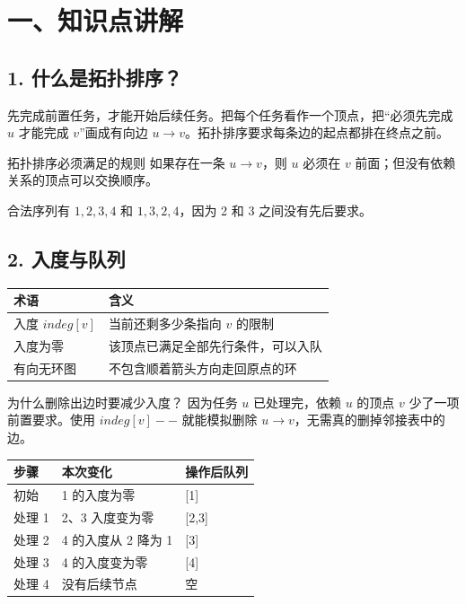 \documentclass[UTF8,11pt]{ctexart}
\begin{document}
\section{一、知识点讲解}
\subsection{1. 什么是拓扑排序？}
先完成前置任务，才能开始后续任务。把每个任务看作一个顶点，把“必须先完成 $u$ 才能完成 $v$”画成有向边 $u\to v$。拓扑排序要求每条边的起点都排在终点之前。
\begin{lessonblue}{拓扑排序必须满足的规则}
如果存在一条 $u\to v$，则 $u$ 必须在 $v$ 前面；但没有依赖关系的顶点可以交换顺序。
\end{lessonblue}
\begin{center}
\end{center}
\noindent 合法序列有 $1,2,3,4$ 和 $1,3,2,4$，因为 2 和 3 之间没有先后要求。
\subsection{2. 入度与队列}
\begin{center}
\begin{tabularx}{.95\linewidth}{@{}lX@{}}\toprule
术语 & 含义\\\midrule
入度 $indeg[v]$ & 当前还剩多少条指向 $v$ 的限制\\
入度为零 & 该顶点已满足全部先行条件，可以入队\\
有向无环图 & 不包含顺着箭头方向走回原点的环\\\bottomrule
\end{tabularx}
\end{center}
\begin{lessonteal}{为什么删除出边时要减少入度？}
因为任务 $u$ 已处理完，依赖 $u$ 的顶点 $v$ 少了一项前置要求。使用 $indeg[v]--$ 就能模拟删除 $u\to v$，无需真的删掉邻接表中的边。
\end{lessonteal}
\begin{center}
\begin{tabularx}{.98\linewidth}{@{}lXX@{}}\toprule
步骤 & 本次变化 & 操作后队列\\\midrule
初始 & 1 的入度为零 & [1]\\
处理 1 & 2、3 入度变为零 & [2,3]\\
处理 2 & 4 的入度从 2 降为 1 & [3]\\
处理 3 & 4 的入度变为零 & [4]\\
处理 4 & 没有后续节点 & 空\\\bottomrule
\end{tabularx}
\end{center}
\end{document}
